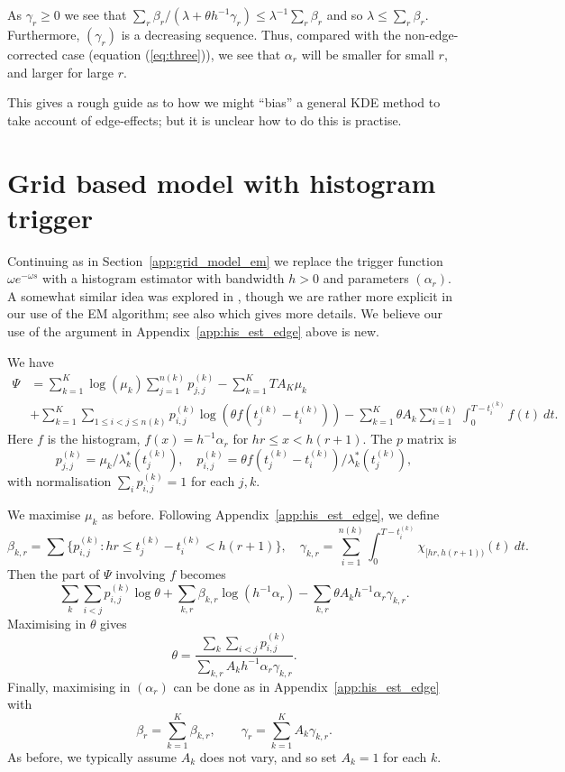 \documentclass[twoside,a4paper]{article}
\theoremstyle{plain}
\theoremstyle{definition}
\begin{document}
As $\gamma_r\geq 0$ we see that $\sum_r \beta_r / (\lambda+\theta h^{-1}\gamma_r) \leq \lambda^{-1}
\sum_r \beta_r$ and so $\lambda \leq \sum_r \beta_r$.  Furthermore, $(\gamma_r)$ is a decreasing
sequence.  Thus, compared with the non-edge-corrected case (equation (\ref{eq:three})),
we see that $\alpha_r$ will be smaller for small $r$, and larger for large $r$.

This gives a rough guide as to how we might ``bias'' a general KDE method to take account of
edge-effects; but it is unclear how to do this is practise.





\section{Grid based model with histogram trigger}\label{app:grid_hist}

Continuing as in Section~\ref{app:grid_model_em} we replace
the trigger function $\omega e^{-\omega s}$
with a histogram estimator with bandwidth $h>0$ and parameters $(\alpha_r)$.
A somewhat similar idea was explored in \cite{ml2}, though we are rather more explicit
in our use of the EM algorithm; see also \cite{ml} which gives more details.
We believe our use of the argument in Appendix~\ref{app:his_est_edge} above is new.

We have
\begin{align*}
\Psi &= \sum_{k=1}^K \log(\mu_k) \sum_{j=1}^{n(k)} p^{(k)}_{j,j}
  - \sum_{k=1}^K TA_K\mu_k \\
&+\sum_{k=1}^K \sum_{1\leq i<j\leq n(k)} p^{(k)}_{i,j} \log(\theta f(t^{(k)}_j - t^{(k)}_i))
- \sum_{k=1}^K \theta A_k \sum_{i=1}^{n(k)} \int_0^{T-t^{(k)}_i} f(t) \ dt.
\end{align*}
Here $f$ is the histogram, $f(x) = h^{-1}\alpha_r$ for $hr \leq x < h(r+1)$.
The $p$ matrix is
\[ p^{(k)}_{j,j} = \mu_k / \lambda^*_k(t^{(k)}_j), \quad
p^{(k)}_{i,j} = \theta f(t^{(k)}_j - t^{(k)}_i) / \lambda^*_k(t^{(k)}_j), \]
with normalisation $\sum_i p^{(k)}_{i,j} = 1$ for each $j,k$.

We maximise $\mu_k$ as before.  Following Appendix~\ref{app:his_est_edge}, we define
\[ \beta_{k,r} = \sum \big\{ p^{(k)}_{i,j} : hr \leq t^{(k)}_j - t^{(k)}_i
< h(r+1) \big\}, \quad
\gamma_{k,r} = \sum_{i=1}^{n(k)} \int_0^{T-t^{(k)}_i}
\chi_{[hr,h(r+1))}(t) \ dt. \]
Then the part of $\Psi$ involving $f$ becomes
\[ \sum_k \sum_{i<j} p^{(k)}_{i,j} \log\theta
+ \sum_{k,r} \beta_{k,r} \log(h^{-1}\alpha_r)
- \sum_{k,r} \theta A_k h^{-1} \alpha_r \gamma_{k,r}. \]
Maximising in $\theta$ gives
\[ \theta = \frac{\sum_k \sum_{i<j} p^{(k)}_{i,j}}{\sum_{k,r} A_k h^{-1}\alpha_r\gamma_{k,r}}. \]
Finally, maximising in $(\alpha_r)$ can be done as in Appendix~\ref{app:his_est_edge}
with
\[ \beta_r = \sum_{k=1}^K \beta_{k,r}, 
\qquad
\gamma_r = \sum_{k=1}^K A_k \gamma_{k,r}. \]
As before, we typically assume $A_k$ does not vary, and so set $A_k=1$ for each $k$.
\end{document}
